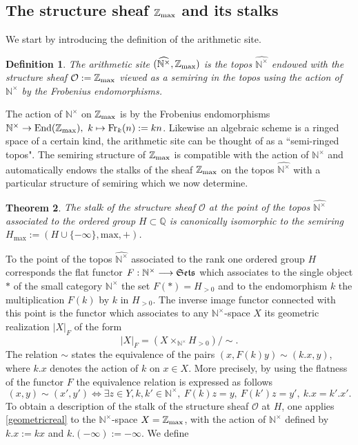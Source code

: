\documentclass[noams,lp]{compositio}
\newtheorem{thm}{Theorem}[section] %
\newtheorem{defn}[thm]{Definition} %
\def\End{{\rm End}}
\def\N{{\mathbb N}}
\def\Q{{\mathbb Q}}
\def\Z{{\mathbb Z}}
\def\cO{{\mathcal O}}
\def\End{{\mbox{End}}}
\def\ff{{\rm  Fr}}
\def\zmax{{\Z_{\rm max}}}
\def\arith{{(\wnt,\bar \N)}}
\def\Se{\frak{ Sets}}
\def\nt{\N^{\times}}
\def\wnt{{\widehat{\N^{\times}}}}
\def\arith{{(\wnt,\zmax)}}
\begin{document}
\subsection{The structure sheaf $\zmax$ and its stalks}
We start by introducing the definition of the arithmetic site.

\begin{defn}\label{site} The arithmetic site $\arith$ is the topos $\wnt$
endowed with the  {\em structure sheaf} $\cO:=\zmax$ viewed as a semiring in the topos using the action of $\nt$ by the Frobenius endomorphisms.
\end{defn}
The action of $\nt$ on $\zmax$ is by the Frobenius endomorphisms 
$\N^\times \to \End(\zmax),~k\mapsto\ff_k(n) := kn$.  
Likewise an algebraic scheme is a ringed space of a certain kind, the arithmetic site can be thought of as a ``semi-ringed topos".
The semiring structure of $\zmax$ is compatible with the action of $\nt$ and automatically endows the stalks   
of the sheaf $\zmax$ on the topos $\wnt$ with a particular structure of semiring which we now determine. 
\begin{thm} \label{structure2} The stalk of the structure sheaf $\cO$ at the point of the topos $\wnt$ associated to the ordered group $H\subset \Q$  is canonically isomorphic to the semiring 
$
H_{\text{max}}:=(H\cup\{-\infty\},\text{max},+)
$.
\end{thm}
\proof To the point of the topos $\wnt$ associated to the rank one ordered group $H$ corresponds the flat functor $F:\nt\longrightarrow\Se$ which associates to the single object $\ast$ of the small category $\nt$ the set $F(\ast)=H_{>0}$ and to the endomorphism $k$ the multiplication $F(k)$ by $k$ in $H_{>0}$. The inverse image functor connected with this point is the functor which associates to  any $\nt$-space $X$ its geometric realization  $|X|_F$ of the form
\begin{equation}\label{geometricreal}
   |X|_F=\left(X\times_{\nt} H_{>0} \right)/\sim.
\end{equation}
The relation $\sim$ states the equivalence of the pairs $(x,F(k)y)\sim (k.x,y)$, where $k.x$ denotes the action of $k$ on $x\in X$. More precisely, by using the flatness of the functor $F$ the equivalence relation is expressed as follows
$$
(x,y)\sim (x',y')\iff \exists z\in Y, k,k'\in \nt, \ F(k)z=y, \ F(k')z=y', \ k.x=k'.x'.
$$
 To obtain a description of the stalk of the structure sheaf $\cO$ at $H$, one applies \eqref{geometricreal} to the $\nt$-space $X=\zmax$, with the action of $\nt$ defined by $k.x:=kx$ and $k.(-\infty):=-\infty$. We define  
\end{document}
